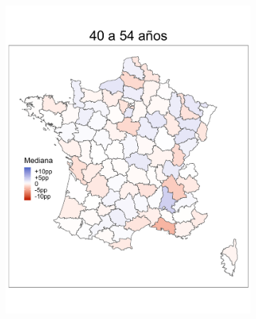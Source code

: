 \begin{figure}
\begin{subfigure}{0.3\textwidth}
	\end{subfigure}
	~
	\begin{subfigure}{0.3\textwidth}
	\includegraphics[width = \textwidth]{Figs/Efectos/Mapa_Efectos_Ed4_Modelo_H}
	\end{subfigure}
	~
	\begin{subfigure}{0.3\textwidth}

\end{subfigure}
\end{figure}
